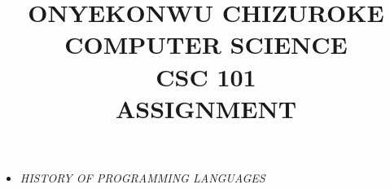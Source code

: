 \documentclass{article}[50pt]
\begin{document}
	\title{\textbf{ONYEKONWU CHIZUROKE
	\\ COMPUTER SCIENCE
\\ CSC 101
\\ ASSIGNMENT}}\maketitle
\begin{itemize}
	\item\emph{HISTORY OF PROGRAMMING LANGUAGES}
\end{itemize}
\end{document}
